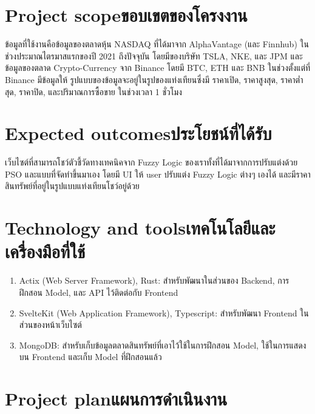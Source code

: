 \section{\ifenglish Project scope\else ขอบเขตของโครงงาน\fi}
ข้อมูลที่ใช้งานคือข้อมูลของตลาดหุ้น NASDAQ ที่ได้มาจาก AlphaVantage (และ Finnhub) ในช่วงประมาณไตรมาสแรกของปี 2021 ถึงปัจจุบัน โดยมีของบริษัท TSLA, NKE, และ JPM 
และข้อมูลของตลาด Crypto-Currency จาก Binance โดยมี BTC, ETH และ BNB ในช่วงตั้งแต่ที่ Binance มีข้อมูลให้ 
รูปแบบของข้อมูลจะอยู่ในรูปของแท่งเทียนซึ่งมี ราคาเปิด, ราคาสูงสุด, ราคาต่ำสุด, ราคาปิด, และปริมาณการซื้อขาย ในช่วงเวลา 1 ชั่วโมง 

\section{\ifenglish Expected outcomes\else ประโยชน์ที่ได้รับ\fi}
เว็บไซต์ที่สามารถโชว์ตัวชี้วัดทางเทคนิคจาก Fuzzy Logic ของเราทั้งที่ได้มาจากการปรับแต่งด้วย PSO และแบบที่จัดทำขึ้นมาเอง 
โดยมี UI ให้ user ปรับแต่ง Fuzzy Logic ต่างๆ เองได้ และมีราคาสินทรัพย์ที่อยู่ในรูปแบบแท่งเทียนโชว์อยู่ด้วย

\section{\ifenglish Technology and tools\else เทคโนโลยีและเครื่องมือที่ใช้\fi}
\begin{enumerate}
    \item Actix (Web Server Framework), Rust: สำหรับพัฒนาในส่วนของ Backend, การฝึกสอน Model, และ API ไว้ติดต่อกับ Frontend
    \item SvelteKit (Web Application Framework), Typescript: สำหรับพัฒนา Frontend ในส่วนของหน้าเว็บไซต์
    \item MongoDB: สำหรับเก็บข้อมูลตลาดสินทรัพย์ที่เอาไว้ใช้ในการฝึกสอน Model, ใช้ในการแสดงบน Frontend และเก็บ Model ที่ฝึกสอนแล้ว
\end{enumerate}

\section{\ifenglish Project plan\else แผนการดำเนินงาน\fi}


